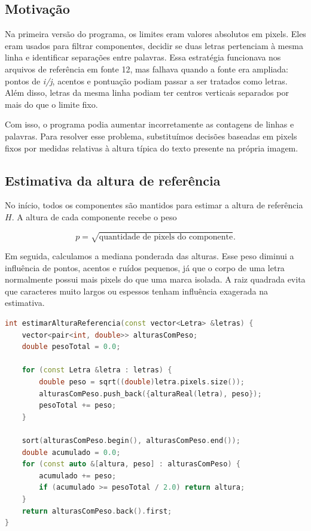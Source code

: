 \documentclass[12pt,a4paper]{article}
\begin{document}
\subsection{Motivação}

Na primeira versão do programa, os limites eram valores absolutos em pixels. Eles eram usados para filtrar componentes, decidir se duas letras pertenciam à mesma linha e identificar separações entre palavras. Essa estratégia funcionava nos arquivos de referência em fonte 12, mas falhava quando a fonte era ampliada: pontos de \textit{i/j}, acentos e pontuação podiam passar a ser tratados como letras. Além disso, letras da mesma linha podiam ter centros verticais separados por mais do que o limite fixo.

Com isso, o programa podia aumentar incorretamente as contagens de linhas e palavras. Para resolver esse problema, substituímos decisões baseadas em pixels fixos por medidas relativas à altura típica do texto presente na própria imagem.

\subsection{Estimativa da altura de referência}

No início, todos os componentes são mantidos para estimar a altura de referência $H$. A altura de cada componente recebe o peso

\[
p = \sqrt{\text{quantidade de pixels do componente}}.
\]

Em seguida, calculamos a mediana ponderada das alturas. Esse peso diminui a influência de pontos, acentos e ruídos pequenos, já que o corpo de uma letra normalmente possui mais pixels do que uma marca isolada. A raiz quadrada evita que caracteres muito largos ou espessos tenham influência exagerada na estimativa.

\begin{lstlisting}[language=C++,caption={Estimativa ponderada da altura típica do texto.}]
int estimarAlturaReferencia(const vector<Letra> &letras) {
    vector<pair<int, double>> alturasComPeso;
    double pesoTotal = 0.0;

    for (const Letra &letra : letras) {
        double peso = sqrt((double)letra.pixels.size());
        alturasComPeso.push_back({alturaReal(letra), peso});
        pesoTotal += peso;
    }

    sort(alturasComPeso.begin(), alturasComPeso.end());
    double acumulado = 0.0;
    for (const auto &[altura, peso] : alturasComPeso) {
        acumulado += peso;
        if (acumulado >= pesoTotal / 2.0) return altura;
    }
    return alturasComPeso.back().first;
}
\end{lstlisting}
\end{document}
